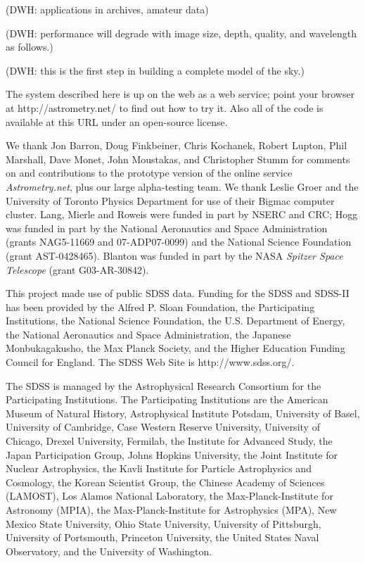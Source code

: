 \documentclass[12pt,preprint]{aastex}
\newcommand{\An}{\textsl{Astrometry.net}}
\renewcommand{\%}{\percent}
\begin{document}
(DWH: applications in archives, amateur data)

(DWH: performance will degrade with image size, depth, quality, and
wavelength as follows.)

(DWH: this is the first step in building a complete model of the sky.)

The system described here is up on the web as a web service; point
your browser at http://astrometry.net/ to find out how to try it.
Also all of the code is available at this URL under an open-source
license.

\acknowledgments We thank Jon Barron, Doug Finkbeiner, Chris Kochanek,
Robert Lupton, Phil Marshall, Dave Monet, John Moustakas, and
Christopher Stumm for comments on and contributions to the prototype
version of the online service \An, plus our large alpha-testing team.
We thank Leslie Groer and the University of Toronto Physics Department
for use of their Bigmac computer cluster.  Lang, Mierle and Roweis
were funded in part by NSERC and CRC; Hogg was funded in part by the
National Aeronautics and Space Administration (grants NAG5-11669 and
07-ADP07-0099) and the National Science Foundation (grant
AST-0428465).  Blanton was funded in part by the NASA \textit{Spitzer
Space Telescope} (grant G03-AR-30842).

This project made use of public SDSS data.  Funding for the SDSS and
SDSS-II has been provided by the Alfred P. Sloan Foundation, the
Participating Institutions, the National Science Foundation, the
U.S. Department of Energy, the National Aeronautics and Space
Administration, the Japanese Monbukagakusho, the Max Planck Society,
and the Higher Education Funding Council for England. The SDSS Web
Site is http://www.sdss.org/.

The SDSS is managed by the Astrophysical Research Consortium for the
Participating Institutions. The Participating Institutions are the
American Museum of Natural History, Astrophysical Institute Potsdam,
University of Basel, University of Cambridge, Case Western Reserve
University, University of Chicago, Drexel University, Fermilab, the
Institute for Advanced Study, the Japan Participation Group, Johns
Hopkins University, the Joint Institute for Nuclear Astrophysics, the
Kavli Institute for Particle Astrophysics and Cosmology, the Korean
Scientist Group, the Chinese Academy of Sciences (LAMOST), Los Alamos
National Laboratory, the Max-Planck-Institute for Astronomy (MPIA),
the Max-Planck-Institute for Astrophysics (MPA), New Mexico State
University, Ohio State University, University of Pittsburgh,
University of Portsmouth, Princeton University, the United States
Naval Observatory, and the University of Washington.
\end{document}
